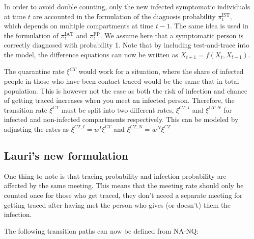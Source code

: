 \documentclass{article}
\begin{document}
In order to avoid double counting, only the new infected symptomatic individuals at time $t$ are accounted in the formulation of the diagnosis probability $\pi_t^\mathrm{IST}$, which depends on multiple compartments at time $t-1$. The same idea is used in the formulation of $\pi_t^\mathrm{IAT}$ and $\pi_t^\mathrm{FP}$. We assume here that a symptomatic person is correctly diagnosed with probability 1. Note that by including test-and-trace into the model, the difference equations can now be written as $X_{t+1} = f(X_t, X_{t-1})$. 

The quarantine rate $\xi^{CT}$ would work for a situation, where the share of infected people  in those who have been contact traced would be the same that in total population. This is however not the case as both the risk of infection and chance of getting traced increases when you meet an infected person. Therefore, the transition rate $\xi^{CT}$ must be split into two different rates, $\xi^{CT, I}$ and $\xi^{CT, N}$ for infected and non-infected compartments respectively. This can be modeled by adjusting the rates as $\xi^{CT, I} = w^I \xi^{CT}$ and $\xi^{CT, N} = w^N \xi^{CT}$ 


\subsection{Lauri's new formulation}
One thing to note is that tracing probability and infection probability are affected by the same meeting. This means that the meeting rate should only be counted once for those who get traced, they don't neeed a separate meeting for getting traced after having met the person who gives (or doesn't) them the infection.

The following transition paths can now be defined from NA-NQ:
\end{document}
